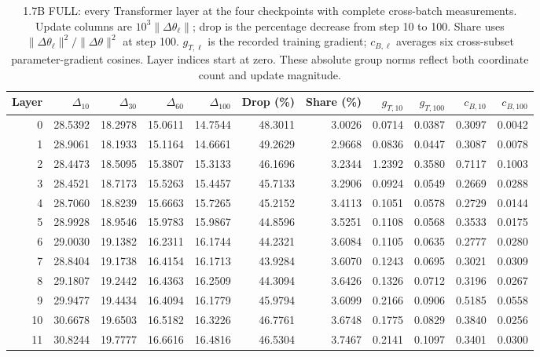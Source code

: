 \begin{table}[!htbp]
\centering
\caption{1.7B FULL: every Transformer layer at the four checkpoints with complete cross-batch measurements. Update columns are $10^3\|\Delta\theta_\ell\|$; drop is the percentage decrease from step 10 to 100. Share uses $\|\Delta\theta_\ell\|^2/\|\Delta\theta\|^2$ at step 100. $g_{T,\ell}$ is the recorded training gradient; $c_{B,\ell}$ averages six cross-subset parameter-gradient cosines. Layer indices start at zero. These absolute group norms reflect both coordinate count and update magnitude.}
\label{tab:parameter_layers_17}
\fontsize{8.5}{10.5}\selectfont\setlength{\tabcolsep}{4pt}
\begin{tabular}{rrrrrrrrrrr}
\toprule
Layer & $\Delta_{10}$ & $\Delta_{30}$ & $\Delta_{60}$ & $\Delta_{100}$ & Drop (\%) & Share (\%) & $g_{T,10}$ & $g_{T,100}$ & $c_{B,10}$ & $c_{B,100}$ \\
\midrule
0 & 28.5392 & 18.2978 & 15.0611 & 14.7544 & 48.3011 & 3.0026 & 0.0714 & 0.0387 & 0.3097 & 0.0042 \\
1 & 28.9061 & 18.1933 & 15.1164 & 14.6661 & 49.2629 & 2.9668 & 0.0836 & 0.0447 & 0.3087 & 0.0078 \\
2 & 28.4473 & 18.5095 & 15.3807 & 15.3133 & 46.1696 & 3.2344 & 1.2392 & 0.3580 & 0.7117 & 0.1003 \\
3 & 28.4521 & 18.7173 & 15.5263 & 15.4457 & 45.7133 & 3.2906 & 0.0924 & 0.0549 & 0.2669 & 0.0288 \\
4 & 28.7060 & 18.8239 & 15.6663 & 15.7265 & 45.2152 & 3.4113 & 0.1051 & 0.0578 & 0.2729 & 0.0144 \\
5 & 28.9928 & 18.9546 & 15.9783 & 15.9867 & 44.8596 & 3.5251 & 0.1108 & 0.0568 & 0.3533 & 0.0175 \\
6 & 29.0030 & 19.1382 & 16.2311 & 16.1744 & 44.2321 & 3.6084 & 0.1105 & 0.0635 & 0.2777 & 0.0280 \\
7 & 28.8404 & 19.1738 & 16.4154 & 16.1713 & 43.9284 & 3.6070 & 0.1243 & 0.0695 & 0.3021 & 0.0309 \\
8 & 29.1807 & 19.2442 & 16.4363 & 16.2509 & 44.3094 & 3.6426 & 0.1326 & 0.0712 & 0.3196 & 0.0267 \\
9 & 29.9477 & 19.4434 & 16.4094 & 16.1779 & 45.9794 & 3.6099 & 0.2166 & 0.0906 & 0.5185 & 0.0558 \\
10 & 30.6678 & 19.6503 & 16.5182 & 16.3226 & 46.7761 & 3.6748 & 0.1775 & 0.0829 & 0.3840 & 0.0256 \\
11 & 30.8244 & 19.7777 & 16.6616 & 16.4816 & 46.5304 & 3.7467 & 0.2141 & 0.1097 & 0.3401 & 0.0300 \\

\end{tabular}
\end{table}
